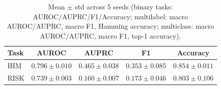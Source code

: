 \begin{table}[h]
\centering
\begin{tabular}{l|cccc}
\hline
Task & AUROC & AUPRC & F1 & Accuracy \\
\hline
IHM & $0.796 \pm 0.010$ & $0.465 \pm 0.038$ & $0.353 \pm 0.085$ & $0.854 \pm 0.011$ \\
RISK & $0.739 \pm 0.003$ & $0.160 \pm 0.007$ & $0.173 \pm 0.046$ & $0.803 \pm 0.106$ \\
\hline
\end{tabular}
\caption{Mean $\pm$ std across 5 seeds (binary tasks: AUROC/AUPRC/F1/Accuracy; multilabel: macro AUROC/AUPRC, macro F1, Hamming accuracy; multiclass: macro AUROC/AUPRC, macro F1, top-1 accuracy).}
\end{table}
